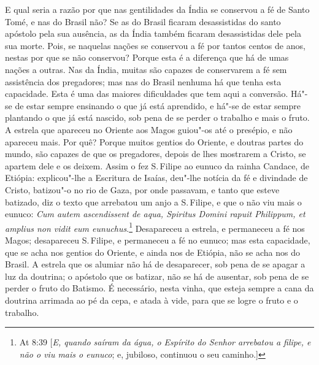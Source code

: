 E qual seria a razão por que nas gentilidades da Índia se conservou a fé
de Santo Tomé, e nas do Brasil não? Se as do Brasil ficaram
desassistidas do santo apóstolo pela sua ausência, as da Índia também
ficaram desassistidas dele pela sua morte. Pois, se naquelas nações se
conservou a fé por tantos centos de anos, nestas por que se não
conservou? Porque esta é a diferença que há de umas nações a outras. Nas
da Índia, muitas são capazes de conservarem a fé sem assistência dos
pregadores; mas nas do Brasil nenhuma há que tenha esta capacidade. Esta
é uma das maiores dificuldades que tem aqui a conversão. Há"- se de estar
sempre ensinando o que já está aprendido, e há"-se de estar sempre
plantando o que já está nascido, sob pena de se perder o trabalho e mais
o fruto. A estrela que apareceu no Oriente aos Magos guiou"-os até o
presépio, e não apareceu mais. Por quê? Porque muitos gentios do
Oriente, e doutras partes do mundo, são capazes de que os pregadores,
depois de lhes mostrarem a Cristo, se apartem dele e os deixem. Assim o
fez S.\,Filipe ao eunuco da rainha Candace, de Etiópia: explicou"-lhe a
Escritura de Isaías, deu"-lhe notícia da fé e divindade de Cristo,
batizou"-o no rio de Gaza, por onde passavam, e tanto que esteve
batizado, diz o texto que arrebatou um anjo a S.\,Filipe, e que o não viu
mais o eunuco: \emph{Cum autem ascendissent de aqua, Spiritus Domini
rapuit Philippum, et amplius non vidit eum eunuchus}.\footnote{At 8:39 [\emph{E, quando saíram da água, o Espírito do Senhor arrebatou a filipe, e não o viu mais o
eunuco}; e, jubiloso, continuou o seu caminho.]}
Desapareceu a estrela, e permaneceu a fé nos Magos; desapareceu S.\,Filipe, e permaneceu a fé no eunuco; mas esta capacidade, que se acha
nos gentios do Oriente, e ainda nos de Etiópia, não se acha nos do
Brasil. A estrela que os alumiar não há de desaparecer, sob pena de se
apagar a luz da doutrina; o apóstolo que os batizar, não se há de
ausentar, sob pena de se perder o fruto do Batismo. É necessário, nesta
vinha, que esteja sempre a cana da doutrina arrimada ao pé da cepa, e
atada à vide, para que se logre o fruto e o trabalho.

